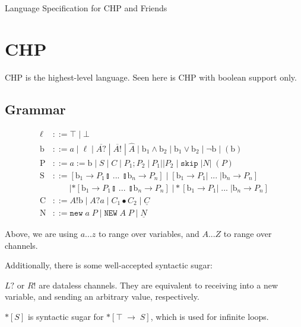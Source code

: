 \documentclass[times,10pt]{article}
\begin{document}
\begin{center}
\Large Language Specification for CHP and Friends
\end{center}

\section{CHP}

CHP is the highest-level language.  Seen here is CHP with boolean support only.

\subsection{Grammar}

\begin{align*}
    \ell & ::= \top \; | \perp \\
    \mathrm{b} & ::= a \; | \; \ell \; | \; \overline{A?} \; | \; \overline{A!} \; | \; \widehat{A} \; | \; \mathrm{b}_1 \wedge \mathrm{b}_2 \; | \; \mathrm{b}_1 \vee \mathrm{b}_2 \; | \; \lnot \mathrm{b} \; | \; (\mathrm{b})\\
    \mathrm{P} & ::= a := \mathrm{b} \; | \; S \; | \; C \; | \; P_1; P_2 \; | \: P_1 || P_2 \; | \; \mathtt{skip} \; | N | \; (P)\\
    \mathrm{S} & ::= [ \mathrm{b}_1 \rightarrow P_1 \talloblong \; ... \; \talloblong \mathrm{b}_n \rightarrow P_n ] \; | \; [ \mathrm{b}_1 \rightarrow P_1 | \; ... \; | \mathrm{b}_n \rightarrow P_n ] \\
        & \qquad | *[ \mathrm{b}_1 \rightarrow P_1 \talloblong \; ... \; \talloblong \mathrm{b}_n \rightarrow P_n ] \; | *[ \mathrm{b}_1 \rightarrow P_1 | \; ... \; | \mathrm{b}_n \rightarrow P_n ] \\
    \mathrm{C} & ::= A!\mathrm{b} \; | \; A?a \; | \; C_1 \bullet C_2 \; | \; \underline{C} \\
    \mathrm{N} & ::= \mathtt{new} \; a \; P \; | \; \mathtt{NEW} \; A \; P \; | \; \underline{N}
\end{align*}

Above, we are using $a ... z$ to range over variables, and $A ... Z$ to range over channels.

Additionally, there is some well-accepted syntactic sugar:

$L?$ or $R!$ are dataless channels.  They are equivalent to receiving into a new variable, and sending an arbitrary value, respectively.

$*[S]$ is syntactic sugar for $*[ \top \; \rightarrow \; S]$, which is used for infinite loops. 
\end{document}
